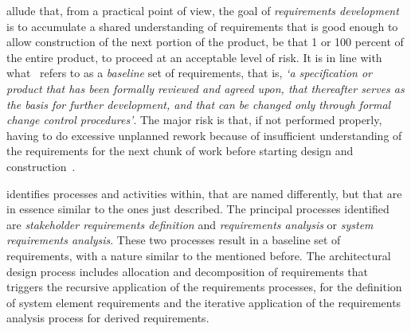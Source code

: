 \documentclass[dissertation,final]{softeng}
\begin{document}
\citet{Wiegers2013} allude that, from a practical point of view, the goal of \emph{requirements development} is to accumulate a shared understanding of requirements that is good enough to allow construction of the next portion of the product, be that 1 or 100 percent of the entire product, to proceed at an acceptable level of risk. It is in line with what~ refers to as a \emph{baseline} set of requirements, that is, \emph{`a specification or product that has been formally reviewed and agreed upon, that thereafter serves as the basis for further development, and that can be changed only through formal change control procedures'}. The major risk is that, if not performed properly, having to do excessive unplanned rework because of insufficient understanding of the requirements for the next chunk of work before starting design and construction~\citep{Wiegers2013}.

 identifies processes and activities within, that are named differently, but that are in essence similar to the ones just described. The principal processes identified are \emph{stakeholder requirements definition} and \emph{requirements analysis} or \emph{system requirements analysis}. These two processes result in a baseline set of requirements, with a nature similar to the mentioned before. The architectural design process includes allocation and decomposition of requirements that triggers the recursive application of the requirements processes, for the definition of system element requirements and the iterative application of the requirements analysis process for derived requirements.
\end{document}
